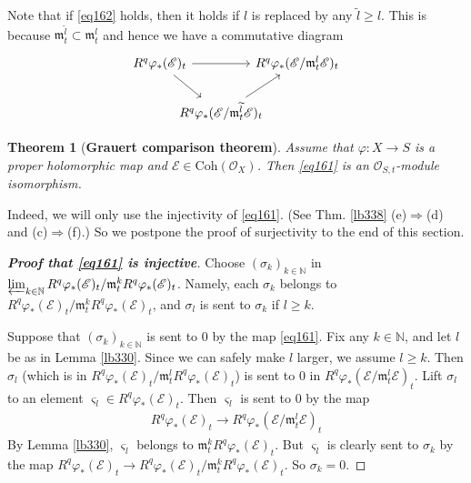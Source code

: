 \documentclass[12pt,b5paper,notitlepage]{report}
\theoremstyle{definition}
\theoremstyle{plain}
\newtheorem{thm}[df]{Theorem}
\newcommand{\wtd}{\widetilde}
\newcommand{\scr}{\mathscr}
\newcommand{\sgm}{\varsigma}
\newcommand{\Nbb}{\mathbb N}
\newcommand{\mk}{\mathfrak m}
\newcommand{\Coh}{\mathrm{Coh}}
\numberwithin{equation}{section}
\begin{document}
Note that if \eqref{eq162} holds, then it holds if $l$ is replaced by any $\wtd l\geq l$. This is because $\mk_t^{\wtd l}\subset\mk_t^l$ and hence we have a commutative diagram
\begin{equation*}
\begin{tikzcd}[column sep=-0.5cm]
R^q\varphi_*(\scr E)_t \arrow[rr] \arrow[rd] &              & R^q\varphi_*(\scr E/\mk_t^l\scr E)_t \\
                        & R^q\varphi_*(\scr E/\mk_t^{\wtd l}\scr E)_t \arrow[ru] &  
\end{tikzcd}
\end{equation*}



\begin{thm}[\textbf{Grauert comparison theorem}]\label{lb341} 
Assume that $\varphi:X\rightarrow S$ is a proper holomorphic map and $\scr E\in\Coh(\scr O_X)$. Then \eqref{eq161} is an $\scr O_{S,t}$-module isomorphism.
\end{thm}



Indeed, we will only use the injectivity of \eqref{eq161}. (See Thm. \ref{lb338} (e)$\Rightarrow$(d) and (c)$\Rightarrow$(f).) So we postpone the proof of surjectivity to the end of this section.


\begin{proof}[\textbf{Proof that \eqref{eq161} is injective}]

Choose $(\sigma_k)_{k\in\Nbb}$ in $\varprojlim_{k\in\Nbb}R^q\varphi_*(\scr E)_t/\mk_t^k R^q\varphi_*(\scr E)_t$. Namely, each $\sigma_k$ belongs to $R^q\varphi_*(\scr E)_t/\mk_t^k R^q\varphi_*(\scr E)_t$, and $\sigma_l$ is sent to $\sigma_k$ if $l\geq k$.

Suppose that $(\sigma_k)_{k\in\Nbb}$ is sent to $0$ by the map \eqref{eq161}. Fix any $k\in\Nbb$, and let $l$ be as in Lemma \ref{lb330}. Since we can safely make $l$ larger, we assume $l\geq k$. Then $\sigma_l$ (which is in $R^q\varphi_*(\scr E)_t/\mk_t^l R^q\varphi_*(\scr E)_t$) is sent to $0$ in $R^q\varphi_*(\scr E/\mk_t^l\scr E)_t$. Lift $\sigma_l$ to an element $\sgm_l\in R^q\varphi_*(\scr E)_t$. Then $\sgm_l$ is sent to $0$ by the map
\begin{align*}
R^q\varphi_*(\scr E)_t\rightarrow R^q\varphi_*(\scr E/\mk_t^l\scr E)_t
\end{align*}
By Lemma \ref{lb330}, $\sgm_l$ belongs to $\mk_t^k R^q\varphi_*(\scr E)_t$. But $\sgm_l$ is clearly sent to $\sigma_k$ by the map $R^q\varphi_*(\scr E)_t\rightarrow R^q\varphi_*(\scr E)_t/\mk_t^k R^q\varphi_*(\scr E)_t$. So $\sigma_k=0$.
\end{proof}
\end{document}
